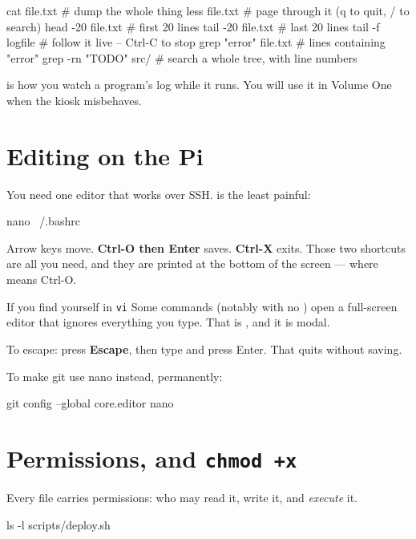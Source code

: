 \begin{shell}
cat file.txt              # dump the whole thing
less file.txt             # page through it (q to quit, / to search)
head -20 file.txt         # first 20 lines
tail -20 file.txt         # last 20 lines
tail -f logfile           # follow it live -- Ctrl-C to stop
grep "error" file.txt     # lines containing "error"
grep -rn "TODO" src/      # search a whole tree, with line numbers
\end{shell}

 is how you watch a program's log while it runs. You will use it in
Volume One when the kiosk misbehaves.

\section{Editing on the Pi}

You need one editor that works over SSH.  is the least painful:

\begin{shell}
nano ~/.bashrc
\end{shell}

Arrow keys move. \textbf{Ctrl-O then Enter} saves. \textbf{Ctrl-X} exits. Those
two shortcuts are all you need, and they are printed at the bottom of the screen
--- where  means Ctrl-O.

\begin{trap}{If you find yourself in \texttt{vi}}
Some commands (notably  with no ) open a full-screen
editor that ignores everything you type. That is , and it is modal.

To escape: press \textbf{Escape}, then type \textbf{} and press Enter.
That quits without saving.

To make git use nano instead, permanently:
\begin{shell}
git config --global core.editor nano
\end{shell}
\end{trap}

\section{Permissions, and \texttt{chmod +x}}

Every file carries permissions: who may read it, write it, and \emph{execute} it.

\begin{shell}
ls -l scripts/deploy.sh
\end{shell}

